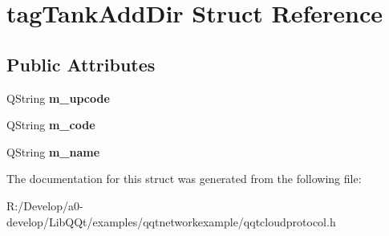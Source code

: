 \hypertarget{structtag_tank_add_dir}{}\section{tag\+Tank\+Add\+Dir Struct Reference}
\label{structtag_tank_add_dir}
\subsection*{Public Attributes}
\begin{DoxyCompactItemize}
\item 
\mbox{\label{structtag_tank_add_dir_a874445abb1e71b82936d166c0fcc124d}} 
Q\+String {\bfseries m\+\_\+upcode}
\item 
\mbox{\label{structtag_tank_add_dir_aea734c849af6bf8552bc4be8737588db}} 
Q\+String {\bfseries m\+\_\+code}
\item 
\mbox{\label{structtag_tank_add_dir_aad9ea20bc0a59362a7178379a2b7b1ba}} 
Q\+String {\bfseries m\+\_\+name}
\end{DoxyCompactItemize}


The documentation for this struct was generated from the following file\+:\begin{DoxyCompactItemize}
\item 
R\+:/\+Develop/a0-\/develop/\+Lib\+Q\+Qt/examples/qqtnetworkexample/qqtcloudprotocol.\+h\end{DoxyCompactItemize}

